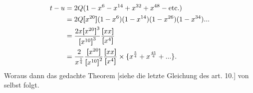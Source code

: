 \[\begin{aligned}
t-u&=2Q(1-x^6-x^{14}+x^{32}+x^{48}-\text{etc.})\\
&=2Q\boldsymbol{[}x^{20}\boldsymbol{]}(1-x^6)(1-x^{14})(1-x^{26})(1-x^{34}){.}{.}{.}\\
&=\frac{2x\boldsymbol{[}x^{20}\boldsymbol{]}^3}{\boldsymbol{[}x^{10}\boldsymbol{]}^3}\frac{\boldsymbol{[}xx\boldsymbol{]}}{\boldsymbol{[}x^4\boldsymbol{]}}\\
&=\frac2{x^{\frac14}}\frac{\boldsymbol{[}x^{20}\boldsymbol{]}}{\boldsymbol{[}x^{10}\boldsymbol{]}^2}\frac{\boldsymbol{[}xx\boldsymbol{]}}{\boldsymbol{[}x^4\boldsymbol{]}}\times\{x^{\frac54}+x^{\frac{45}4}+{.}{.}{.}\}.
\end{aligned}\]
\noindent Woraus dann das gedachte Theorem [siehe die letzte Gleichung des art. 10.] von selbst folgt.
\clearpage
\endgroup
